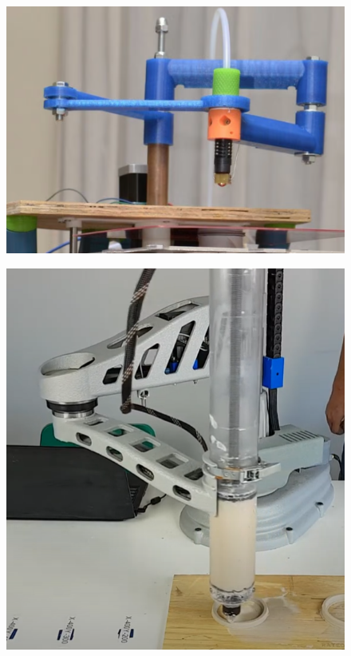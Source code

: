 \documentclass[12pt, english]{article}
\begin{document}
\begin{enumerate}[leftmargin=*, listparindent=0.7cm]
{		\begin{figure}[H]
			\centering
			\begin{minipage}{.5\textwidth}
				\centering
				\includegraphics[height=.8\linewidth]{FDM-Scara.png}
				\label{fig:fdmscara}
			\end{minipage}%
			\begin{minipage}{.5\textwidth}
				\centering
				\includegraphics[height=.8\linewidth]{FDM-Scara-Potter.png}
				\label{fig:potter}
			\end{minipage}
		\end{figure}

}
\end{enumerate}
\end{document}
